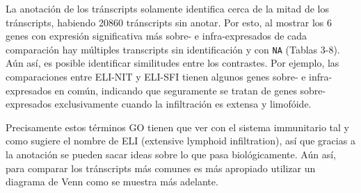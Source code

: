 \documentclass[
]{article}
\begin{document}
La anotación de los tránscripts solamente identifica cerca de la mitad
de los tránscripts, habiendo 20860 tránscripts sin anotar. Por esto, al
mostrar los 6 genes con expresión significativa más sobre- e
infra-expresados de cada comparación hay múltiples transcripts sin
identificación y con \texttt{NA} (Tablas 3-8). Aún así, es posible
identificar similitudes entre los contrastes. Por ejemplo, las
comparaciones entre ELI-NIT y ELI-SFI tienen algunos genes sobre- e
infra-expresados en común, indicando que seguramente se tratan de genes
sobre-expresados exclusivamente cuando la infiltración es extensa y
limofóide.

Precisamente estos términos GO tienen que ver con el sistema immunitario
tal y como sugiere el nombre de ELI (extensive lymphoid infiltration),
así que gracias a la anotación se pueden sacar ideas sobre lo que pasa
biológicamente. Aún así, para comparar los tránscripts más comunes es
más apropiado utilizar un diagrama de Venn como se muestra más adelante.

\begin{table}

\caption{\label{tab:unnamed-chunk-3}Genes significativos con mayor infra-expresión del contraste SFI-NIT.}
\centering
{}
\end{table}
\end{document}
